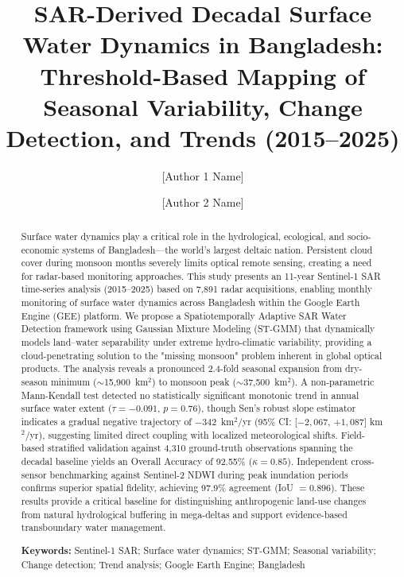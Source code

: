 \documentclass[fleqn,10pt,twocolumn]{article}
\title{
SAR-Derived Decadal Surface Water Dynamics in Bangladesh:\\
Threshold-Based Mapping of Seasonal Variability, Change Detection, and Trends (2015--2025)
}
\author[1]{[Author 1 Name]}
\author[2]{[Author 2 Name]}
\affil[1]{[Author 1 Affiliation Details]}
\affil[2]{[Author 2 Affiliation Details]}
\affil[*]{Corresponding author: [Contact Email]} %
\date{} %
\begin{document}
\maketitle

\begin{abstract}
Surface water dynamics play a critical role in the hydrological, ecological, and socio-economic systems of Bangladesh---the world's largest deltaic nation. Persistent cloud cover during monsoon months severely limits optical remote sensing, creating a need for radar-based monitoring approaches. This study presents an 11-year Sentinel-1 SAR time-series analysis (2015--2025) based on 7,891 radar acquisitions, enabling monthly monitoring of surface water dynamics across Bangladesh within the Google Earth Engine (GEE) platform. We propose a Spatiotemporally Adaptive SAR Water Detection framework using Gaussian Mixture Modeling (ST-GMM) that dynamically models land–water separability under extreme hydro-climatic variability, providing a cloud-penetrating solution to the "missing monsoon" problem inherent in global optical products. The analysis reveals a pronounced 2.4-fold seasonal expansion from dry-season minimum ($\sim$15,900~km$^2$) to monsoon peak ($\sim$37,500~km$^2$). A non-parametric Mann-Kendall test \cite{mann1945, kendall1975} detected no statistically significant monotonic trend in annual surface water extent ($\tau = -0.091$, $p = 0.76$), though Sen's robust slope estimator indicates a gradual negative trajectory of $-342$~km$^{2}$/yr (95\% CI: [$-2{,}067$, $+1{,}087$] km$^{2}$/yr), suggesting limited direct coupling with localized meteorological shifts. Field-based stratified validation against 4,310 ground-truth observations spanning the decadal baseline yields an Overall Accuracy of 92.55\% ($\kappa = 0.85$). Independent cross-sensor benchmarking against Sentinel-2 NDWI during peak inundation periods confirms superior spatial fidelity, achieving 97.9\% agreement (IoU $= 0.896$). These results provide a critical baseline for distinguishing anthropogenic land-use changes from natural hydrological buffering in mega-deltas and support evidence-based transboundary water management.

\vspace{0.5em}
\noindent\textbf{Keywords:} Sentinel-1 SAR; Surface water dynamics; ST-GMM; Seasonal variability; Change detection; Trend analysis; Google Earth Engine; Bangladesh
\end{abstract}
\end{document}
